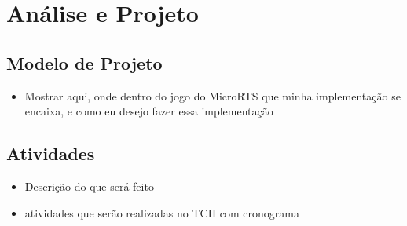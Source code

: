 \chapter{\label{chap:ativ}Análise e Projeto}


\section{Modelo de Projeto}
\begin{itemize}
	\item Mostrar aqui, onde dentro do jogo do MicroRTS que minha implementação se encaixa, e como eu desejo fazer essa implementação
\end{itemize}

\section{Atividades}
\begin{itemize}
	\item Descrição do que será feito
	\item atividades que serão realizadas no TCII com cronograma
\end{itemize}


